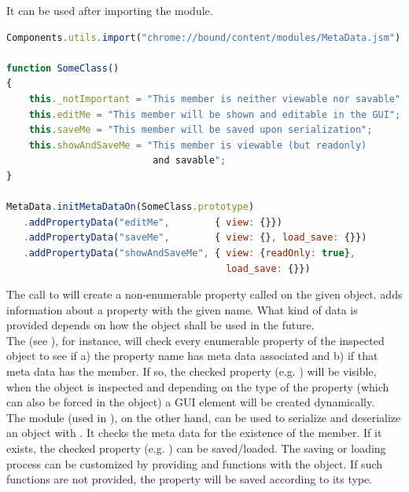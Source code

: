 It can be used after importing the  module.

\SingleSpacing
\begin{lstlisting}[language=JavaScript, caption=Adding meta data to \myProperName{JavaScript} objects]
Components.utils.import("chrome://bound/content/modules/MetaData.jsm")

function SomeClass()
{
	this._notImportant = "This member is neither viewable nor savable";
	this.editMe = "This member will be shown and editable in the GUI";
	this.saveMe = "This member will be saved upon serialization";
	this.showAndSaveMe = "This member is viewable (but readonly)
	                      and savable";
}

MetaData.initMetaDataOn(SomeClass.prototype)
   .addPropertyData("editMe",        { view: {}})
   .addPropertyData("saveMe",        { view: {}, load_save: {}})
   .addPropertyData("showAndSaveMe", { view: {readOnly: true}, 
                                       load_save: {}})
\end{lstlisting}
\OnehalfSpacing

The call to  will create a non-enumerable property called  on the given object.  adds information about a property with the given name. What kind of data is provided depends on how the object shall be used in the future.
\\The {} (see ), for instance, will check every enumerable property of the inspected object to see if a) the property name has meta data associated and b) if that meta data has the  member. If so, the checked property (e.g. ) will be visible, when the object is inspected and depending on the type of the property (which can also be forced in the  object) a GUI element will be created dynamically.
\\The {} module  (used in ), on the other hand, can be used to serialize and deserialize an object with . It checks the meta data for the existence of the  member. If it exists, the checked property (e.g. ) can be saved/loaded. The saving or loading process can be customized by providing  and  functions with the  object. If such functions are not provided, the property will be saved according to its type.

